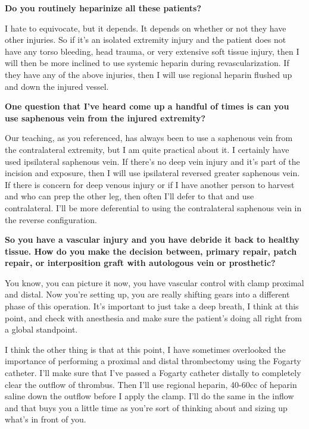 \documentclass[
]{book}
\begin{document}
\textbf{Do you routinely heparinize all these patients?}

I hate to equivocate, but it depends. It depends on whether or not they
have other injuries. So if it's an isolated extremity injury and the
patient does not have any torso bleeding, head trauma, or very extensive
soft tissue injury, then I will then be more inclined to use systemic
heparin during revascularization. If they have any of the above
injuries, then I will use regional heparin flushed up and down the
injured vessel.\citep{liang2016, fox2012}

\textbf{One question that I've heard come up a handful of times is can you use
saphenous vein from the injured extremity?}

Our teaching, as you referenced, has always been to use a saphenous vein
from the contralateral extremity, but I am quite practical about it. I
certainly have used ipsilateral saphenous vein. If there's no deep vein
injury and it's part of the incision and exposure, then I will use
ipsilateral reversed greater saphenous vein. If there is concern for
deep venous injury or if I have another person to harvest and who can
prep the other leg, then often I'll defer to that and use contralateral.
I'll be more deferential to using the contralateral saphenous vein in
the reverse configuration.\citep{liang2016, fox2012}

\textbf{So you have a vascular injury and you have debride it back to healthy
tissue. How do you make the decision between, primary repair, patch
repair, or interposition graft with autologous vein or prosthetic?}

You know, you can picture it now, you have vascular control with clamp
proximal and distal. Now you're setting up, you are really shifting
gears into a different phase of this operation. It's important to just
take a deep breath, I think at this point, and check with anesthesia and
make sure the patient's doing all right from a global standpoint.

I think the other thing is that at this point, I have sometimes
overlooked the importance of performing a proximal and distal
thrombectomy using the Fogarty catheter. I'll make sure that I've passed
a Fogarty catheter distally to completely clear the outflow of thrombus.
Then I'll use regional heparin, 40-60cc of heparin saline down the
outflow before I apply the clamp. I'll do the same in the inflow and
that buys you a little time as you're sort of thinking about and sizing
up what's in front of you.\citep{liang2016, fox2012}
\end{document}
